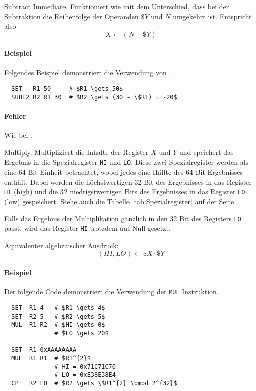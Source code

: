 \glqq Subtract Immediate\grqq.
Funktioniert wie  mit dem Unterschied, dass bei der Subtraktion die
Reihenfolge der Operanden $\$Y$ und $N$ umgekehrt ist. Entspricht also
\[
    X \gets (N - \$Y)
\]
\paragraph{Beispiel}
Folgendes Beispiel demonstriert die Verwendung von .
\begin{lstlisting}
  SET   R1 50     # $R1 \gets 50$
  SUBI2 R2 R1 30  # $R2 \gets (30 - \$R1) = -20$
\end{lstlisting}

\paragraph{Fehler}
Wie bei .



\glqq Multiply\grqq. 
Multipliziert die Inhalte der Register $X$ und $Y$ und speichert das Ergebnis in
die Spezialregister \texttt{HI} und \texttt{LO}. Diese zwei Spezialregister
werden als eine 64-Bit Einheit betrachtet, wobei jedes eine Hälfte des
64-Bit Ergebnisses enthält.
Dabei werden die höchstwertigen 32 Bit des Ergebnisses in das Register
\texttt{HI} (high)
und die 32 niedrigstwertigen Bits des Ergebnisses in das Register
\texttt{LO} (low) gespeichert.
Siehe auch die Tabelle \ref{tab:Spezialregister} auf der Seite
\pageref{tab:Spezialregister}.

Falls das Ergebnis der Multiplikation gänzlich in den 32 Bit des Registers
\texttt{LO} passt, wird das Register \texttt{HI} trotzdem auf Null gesetzt.

Äquivalenter algebraischer Ausdruck:
\[
    (HI, LO) \gets \$X \cdot \$Y
\]

\paragraph{Beispiel} Der folgende Code demonstriert die Verwendung der
\texttt{MUL} Instruktion.
\begin{lstlisting}
  SET  R1 4   # $R1 \gets 4$
  SET  R2 5   # $R2 \gets 5$
  MUL  R1 R2  # $HI \gets 0$
              # $LO \gets 20$

  SET  R1 0xAAAAAAAA
  MUL  R1 R1  # $R1^{2}$
              # HI = 0x71C71C70
              # LO = 0xE38E38E4 
  CP   R2 LO  # $R2 \gets \$R1^{2} \bmod 2^{32}$ 
\end{lstlisting}

